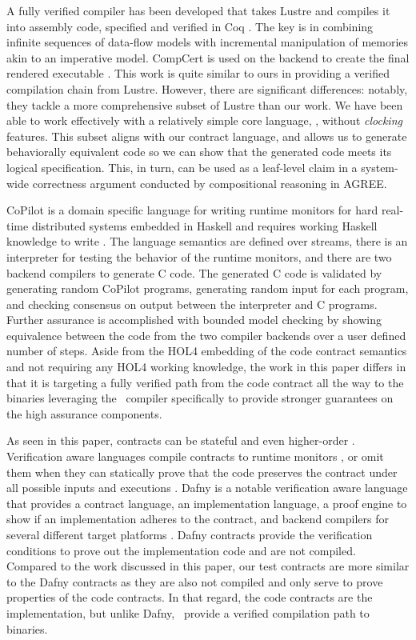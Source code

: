 A fully verified compiler has been developed that takes Lustre and compiles
it into assembly code, specified and verified in Coq \cite{10.1145/3140587.3062358}.
The key is in combining infinite sequences of data-flow models with incremental
manipulation of memories akin to an imperative model. CompCert is used on the
backend to create the final rendered executable \cite{compcert}.
This work is quite similar to
ours in providing a verified compilation chain from Lustre. However,
there are significant differences: notably, they tackle a more
comprehensive subset of Lustre than our work. We have been able to
work effectively with a relatively simple core language, \eg, without
\emph{clocking} features.  This subset aligns with our contract language, and
allows us to generate behaviorally equivalent code so we can show that the
generated code meets its logical specification.  This, in turn,
can be used as a leaf-level claim in a system-wide correctness argument
conducted by compositional reasoning in AGREE.

CoPilot is a domain specific language for writing runtime monitors for
hard real-time distributed systems embedded in Haskell and requires
working Haskell knowledge to write \cite{10.1007/s11334-013-0223-x}.
The language semantics are defined over streams, there is an
interpreter for testing the behavior of the runtime monitors, and
there are two backend compilers to generate C code.  The generated C
code is validated by generating random CoPilot programs, generating
random input for each program, and checking consensus on output
between the interpreter and C programs.  Further assurance is
accomplished with bounded model checking by showing equivalence
between the code from the two compiler backends over a user defined
number of steps.  Aside from the HOL4 embedding of the code contract
semantics and not requiring any HOL4 working knowledge, the work in
this paper differs in that it is targeting a fully verified path from
the code contract all the way to the binaries leveraging the \ckml\
compiler specifically to provide stronger guarantees on the high
assurance components.

As seen in this paper, contracts can be stateful and even
higher-order \cite{10.1145/583852.581484}.  Verification aware
languages compile contracts to runtime
monitors \cite{10.1007/978-3-642-28869-2_11}, or omit them when they
can statically prove that the code preserves the contract under all
possible inputs and executions \cite{10.1145/3158139}. Dafny is a
notable verification aware language that provides a contract language,
an implementation language, a proof engine to show if an
implementation adheres to the contract, and backend compilers for
several different target platforms \cite{dafny}.  Dafny contracts
provide the verification conditions to prove out the implementation
code and are not compiled.  Compared to the work discussed in this
paper, our test contracts are more similar to the Dafny contracts as
they are also not compiled and only serve to prove properties of the
code contracts.  In that regard, the code contracts are the
implementation, but unlike Dafny, \ckml\ provide a verified
compilation path to binaries.
